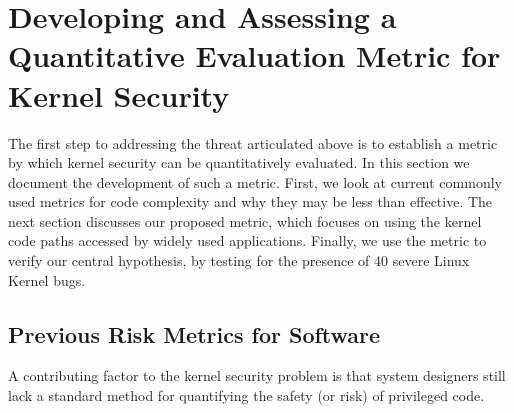 \section{Developing and Assessing a Quantitative Evaluation Metric for
Kernel Security}
\label{sec.metric}

 The first step to addressing the threat articulated above is to establish
a metric by which kernel security can be
quantitatively evaluated. In this section we document the development of such
a metric. First, we look at current commonly used metrics for code complexity and why
they may be less than effective.
The next section discusses our proposed metric, which focuses on
using the kernel code paths accessed by %
widely used applications. Finally, we
use the metric to  %
verify our central hypothesis, by testing for the presence of 40 severe Linux
 Kernel bugs.



\subsection{Previous Risk Metrics for Software}

A contributing factor to the kernel security problem is that system
designers
still lack a standard method for quantifying the safety (or risk) of
privileged code.    


